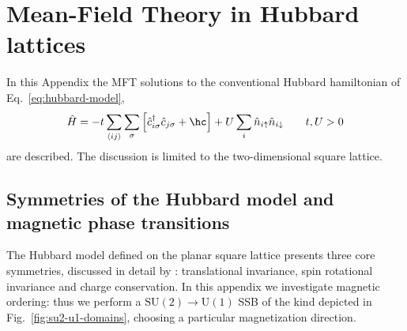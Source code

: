 \def\GraphicsFolder{parts/appendices/mean-field-hubbard/pictures}
\chapter{Mean-Field Theory in Hubbard lattices}\label{appendix:mean-field-hubbard}

In this Appendix the MFT solutions to the conventional Hubbard hamiltonian of Eq.~\eqref{eq:hubbard-model},
\begin{equation}\label{appeq:hubbard-model}
	\hat H = 
	-t \sum_{\langle ij \rangle} \sum_\sigma \left[
		\hat c_{i\sigma}^\dagger \hat c_{j\sigma} + \hc
	\right]
	+ U \sum_i \hat n_{i\uparrow} \hat n_{i\downarrow}
	\qquad
	t, U  > 0
\end{equation}
are described. The discussion is limited to the two-dimensional square lattice.

\section{Symmetries of the Hubbard model and magnetic phase transitions}

The Hubbard model defined on the planar square lattice presents three core symmetries, discussed in detail by \citeauthor{arovas2022hubbard} \cite{arovas2022hubbard}: translational invariance, spin rotational invariance and charge conservation. In this appendix we investigate magnetic ordering: thus we perform a $\mathrm{SU}(2)\to\mathrm{U}(1)$ SSB of the kind depicted in Fig.~\ref{fig:su2-u1-domains}, choosing a particular magnetization direction.

